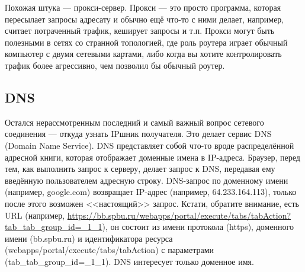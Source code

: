 \documentclass[a5paper]{article}
\begin{document}
Похожая штука --- прокси-сервер. Прокси --- это просто программа, которая пересылает запросы адресату и обычно ещё что-то с ними делает, например, считает потраченный трафик, кеширует запросы и т.п. Прокси могут быть полезными в сетях со странной топологией, где роль роутера играет обычный компьютер с двумя сетевыми картами, либо когда вы хотите контролировать трафик более агрессивно, чем позволил бы обычный роутер.

\subsection{DNS}

Остался нерассмотренным последний и самый важный вопрос сетевого соединения --- откуда узнать IPшник получателя. Это делает сервис DNS (Domain Name Service). DNS представляет собой что-то вроде распределённой адресной книги, которая отображает доменные имена в IP-адреса. Браузер, перед тем, как выполнить запрос к серверу, делает запрос к DNS, передавая ему введённую пользователем адресную строку. DNS-запрос по доменному имени (например, google.com) возвращает IP-адрес (например, 64.233.164.113), только после этого возможен <<настоящий>> запрос. Кстати, обратите внимание, есть URL (например, \url{https://bb.spbu.ru/webapps/portal/execute/tabs/tabAction?tab_tab_group_id=_1_1}), он состоит из имени протокола (https), доменного имени (bb.spbu.ru) и идентификатора ресурса (webapps/portal/execute/tabs/tabAction) с параметрами (tab\_tab\_group\_id=\_1\_1). DNS интересует только доменное имя.
\end{document}
